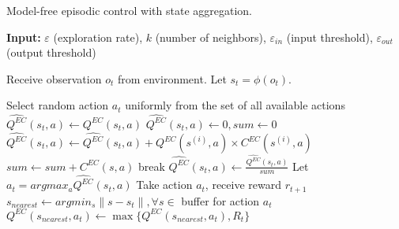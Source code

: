 \documentclass{article}
\begin{document}
\begin{algorithm}[htb]
\caption{Model-free episodic control with state aggregation.}
\hspace*{\algorithmicindent} \textbf{Input:} $\varepsilon$ (exploration rate), $k$ (number of neighbors), $\varepsilon_{in}$ (input threshold), $\varepsilon_{out}$ (output threshold)
\begin{algorithmic}[1]
     
        \State Receive observation $o_t$ from environment.
        \State Let $s_t = \phi(o_t)$. 
        
           
            \State Select random action $a_t$ uniformly from the set of all available actions
        \Else   {}
                  
                    \State $\widehat{Q^{EC}}(s_t, a) \leftarrow Q^{EC}(s_t,a)$  
                \Else   {}
                    \State $\widehat{Q^{EC}}(s_t, a) \leftarrow 0, sum \leftarrow 0$
                        \State $\widehat{Q^{EC}}(s_t, a) \leftarrow \widehat{Q^{EC}}(s_t, a) + Q^{EC}(s^{(i)},a) \times C^{EC}(s^{(i)},a)$ 
                        \State $sum \leftarrow sum +  C^{EC}(s,a)$
                         
                            \State break
                        \EndIf
                    \EndFor
                    \State $\widehat{Q^{EC}}(s_t, a) \leftarrow \frac{\widehat{Q^{EC}}(s_t, a)}{sum} $ 
                \EndIf
            \EndFor
            \State Let $a_t = arg max_a \widehat{Q^{EC}}(s_t, a)$ 
        \EndIf
        \State Take action $a_t$, receive reward $r_{t+1}$
    \EndFor
     
        \State $s_{nearest} \leftarrow argmin_s \|s - s_t\|, \forall s \in $ buffer for action $a_t$  
         
            \State $Q^{EC}(s_{nearest}, a_t) \leftarrow \max\{{ Q^{EC}(s_{nearest}, a_t), R_t}\}$  

\end{algorithmic}
\end{algorithm}
\end{document}
